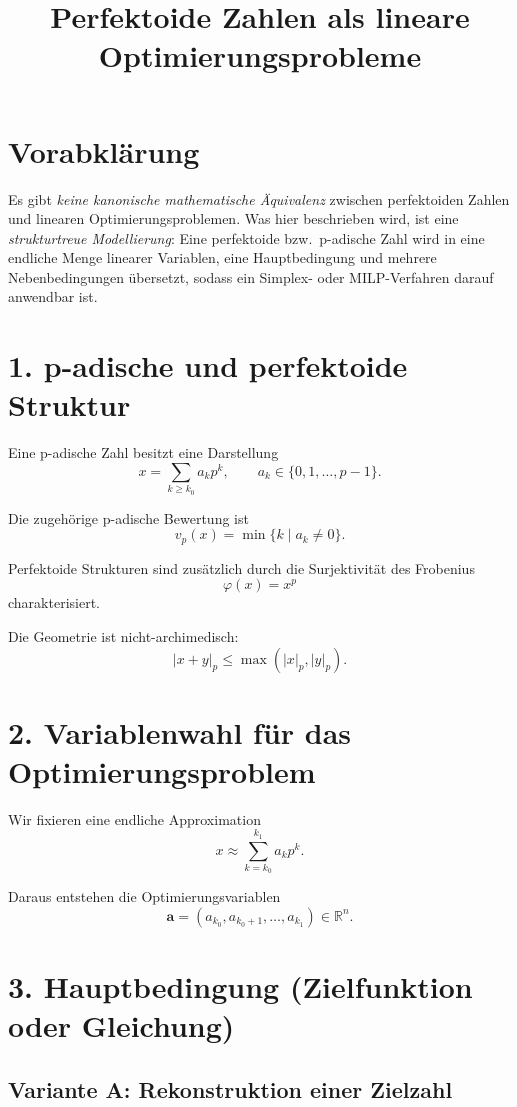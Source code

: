 \documentclass[11pt]{article}
\title{Perfektoide Zahlen als lineare Optimierungsprobleme}
\author{}
\date{}
\begin{document}
\maketitle

\section*{Vorabklärung}

Es gibt \emph{keine kanonische mathematische Äquivalenz} zwischen perfektoiden Zahlen und linearen Optimierungsproblemen.
Was hier beschrieben wird, ist eine \emph{strukturtreue Modellierung}:
Eine perfektoide bzw.\ p-adische Zahl wird in eine endliche Menge linearer Variablen,
eine Hauptbedingung und mehrere Nebenbedingungen übersetzt,
sodass ein Simplex- oder MILP-Verfahren darauf anwendbar ist.

\section*{1. p-adische und perfektoide Struktur}

Eine p-adische Zahl besitzt eine Darstellung
\[
x = \sum_{k \ge k_0} a_k p^k,
\qquad a_k \in \{0,1,\dots,p-1\}.
\]

Die zugehörige p-adische Bewertung ist
\[
v_p(x) = \min\{k \mid a_k \neq 0\}.
\]

Perfektoide Strukturen sind zusätzlich durch die Surjektivität des Frobenius
\[
\varphi(x) = x^p
\]
charakterisiert.

Die Geometrie ist nicht-archimedisch:
\[
|x+y|_p \le \max(|x|_p, |y|_p).
\]

\section*{2. Variablenwahl für das Optimierungsproblem}

Wir fixieren eine endliche Approximation
\[
x \approx \sum_{k=k_0}^{k_1} a_k p^k.
\]

Daraus entstehen die Optimierungsvariablen
\[
\mathbf{a} = (a_{k_0}, a_{k_0+1}, \dots, a_{k_1}) \in \mathbb{R}^{n}.
\]

\section*{3. Hauptbedingung (Zielfunktion oder Gleichung)}

\subsection*{Variante A: Rekonstruktion einer Zielzahl}
\end{document}
